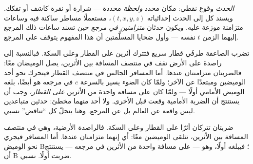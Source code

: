 \begin{definition}\label{def:b3:relativistic-kinematics:event}
\emph{الحدث} وقوع نقطي: مكان محدد \emph{ولحظة} محددة --- شرارة
أو نقرة كاشف أو تفكك. ويسند كل  إلى الحدث إحداثياته
$(t, x, y, z)$، مستعملًا مساطر ساكنة فيه وساعات متزامنة موزعة
عليه. ويكون حدثان \emph{متزامنين في مرجع} حين تسند ساعات ذلك
المرجع إليهما الزمن $t$ نفسه --- وأول ضحايا المسلَّمتين أن هذا
المفهوم يتوقف على المرجع.
\end{definition}

\begin{example}\label{ex:b3:relativistic-kinematics:train}
تضرب الصاعقة طرفَي قطار سريع فتترك أثرين على القطار وعلى السكة.
فبالنسبة إلى راصدة على الأرض تقف في منتصف المسافة بين الأثرين،
يصل الوميضان معًا: فالضربتان متزامنتان عندها. أما المسافر الجالس
في منتصف القطار فيتحرك نحو أحد الوميضين ومبتعدًا عن الآخر؛
ولمّا كان الضوء يسير بالسرعة $c$ في مرجعه هو أيضًا، بلغه الوميض
الأمامي أولًا --- ولمّا كان على مسافة واحدة من الأثرين
\emph{على القطار}، وجب أن يستنتج أن الضربة الأمامية وقعت
\emph{قبل} الأخرى. ولا أحد منهما مخطئ:  حدثين متباعدين
ليس واقعة عن العالم بل عن المرجع. وهنا ينحلّ كل ``تناقض'' نسبي.
\end{example}

\begin{omfigure}

{\small ضربتان تتركان أثرًا على القطار وعلى السكة. فالراصدة
الأرضية، وهي في منتصف المسافة بين الأثرين، تتلقى الوميضين معًا:
أي إنهما متزامنان عندها. أما المسافر فيجري نحو الوميض B؛ فيبلغه
أولًا، وهو --- على مسافة واحدة من الأثرين في مرجعه --- يستنتج
أن B ضربت أولًا.  نسبي.}
\end{omfigure}

